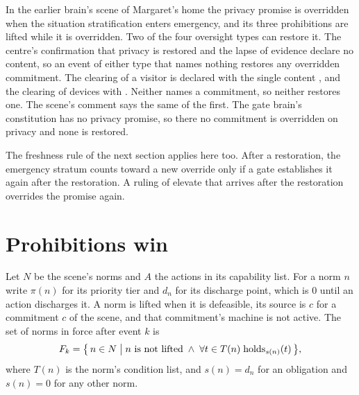 In the earlier brain's scene of Margaret's home the privacy promise is overridden when the situation stratification enters
emergency, and its three prohibitions are lifted while it is overridden. Two of the four oversight
types can restore it. The centre's confirmation that privacy is restored and the lapse of evidence
declare no content, so an event of either type that names nothing restores any overridden
commitment. The clearing of a visitor is declared with the single content , and the
clearing of devices with . Neither names a commitment, so neither restores one. The
scene's comment says the same of the first. The gate brain's constitution has no privacy
promise, so there no commitment is overridden on privacy and none is restored.

The freshness rule of the next section applies here too. After a restoration, the emergency
stratum counts toward a new override only if a gate establishes it again after the restoration. A
ruling of elevate that arrives after the restoration overrides the promise again.

\section{Prohibitions win}\label{sec:runtime-norms}

Let $N$ be the scene's norms and $A$ the actions in its capability list. For a norm $n$ write
$\pi(n)$ for its priority tier and $d_n$ for its discharge point, which is $0$ until an action
discharges it. A norm is lifted when it is defeasible, its source is $c$ for a
commitment $c$ of the scene, and that commitment's machine is not active. The set of norms in force
after event $k$ is
\begin{equation}
F_k = \bigl\{\, n \in N \bigm| n \text{ is not lifted} \;\wedge\; \forall t \in T(n)\;
\mathrm{holds}_{s(n)}(t) \,\bigr\},
\label{eq:in-force}
\end{equation}
where $T(n)$ is the norm's condition list, and $s(n) = d_n$ for an obligation and $s(n) = 0$ for any
other norm.

